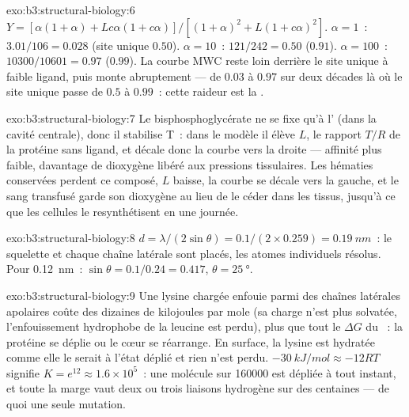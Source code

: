 \begin{solution}{exo:b3:structural-biology:6}
$Y = [\alpha(1+\alpha) + Lc\alpha(1+c\alpha)]/[(1+\alpha)^{2} +
L(1+c\alpha)^{2}]$. $\alpha = 1$~: $3.01/106 = 0.028$ (site unique
$0.50$). $\alpha = 10$~: $121/242 = 0.50$ ($0.91$). $\alpha = 100$~:
$\num{10300}/\num{10601} = 0.97$ ($0.99$). La courbe MWC reste loin
derrière le site unique à faible ligand, puis monte abruptement --- de
$0.03$ à $0.97$ sur deux décades là où le site unique passe de $0.5$ à
$0.99$~: cette raideur est la .
\end{solution}

\begin{solution}{exo:b3:structural-biology:7}
Le bisphosphoglycérate ne se fixe qu'à l' (dans la cavité
centrale), donc il stabilise T~: dans le modèle il élève $L$, le
rapport $T/R$ de la protéine sans ligand, et décale donc la courbe vers
la droite --- affinité plus faible, davantage de dioxygène libéré aux
pressions tissulaires. Les hématies conservées perdent ce composé, $L$
baisse, la courbe se décale vers la gauche, et le sang transfusé garde
son dioxygène au lieu de le céder dans les tissus, jusqu'à ce que les
cellules le resynthétisent en une journée.
\end{solution}

\begin{solution}{exo:b3:structural-biology:8}
$d = \lambda/(2\sin\theta) = 0.1/(2\times 0.259) = \qty{0.19}{nm}$~: le
squelette et chaque chaîne latérale sont placés, les atomes individuels
résolus. Pour \qty{0.12}{nm}~: $\sin\theta = 0.1/0.24 = 0.417$, $\theta =
\qty{25}{\degree}$.
\end{solution}

\begin{solution}{exo:b3:structural-biology:9}
Une lysine chargée enfouie parmi des chaînes latérales apolaires coûte
des dizaines de kilojoules par mole (sa charge n'est plus solvatée,
l'enfouissement hydrophobe de la leucine est perdu), plus que tout le
$\Delta G$ du ~: la protéine se déplie ou le cœur se
réarrange. En surface, la lysine est hydratée comme elle le serait à
l'état déplié et rien n'est perdu.
$\qty{-30}{kJ/mol} \approx -12RT$ signifie $K = e^{12} \approx 1.6\times
10^{5}$~: une molécule sur \num{160000} est dépliée à tout instant, et
toute la marge vaut deux ou trois liaisons hydrogène sur des centaines
--- de quoi une seule mutation.
\end{solution}

